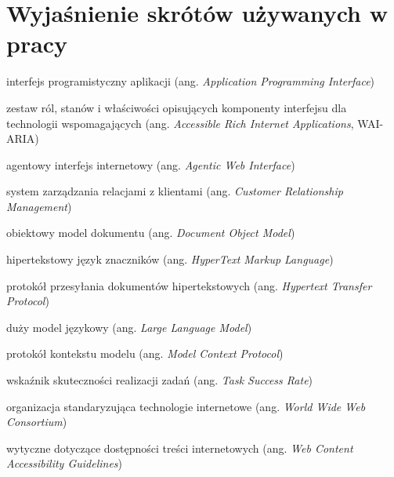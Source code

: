 \documentclass[a4paper,12pt,twoside]{article}
\begin{document}
\section*{Wyjaśnienie skrótów używanych w pracy}
\begin{description}[leftmargin=2.8cm, labelwidth=2.5cm, itemsep=0pt]
    \item[API] interfejs programistyczny aplikacji (ang. \textit{Application Programming Interface})
    \item[ARIA] zestaw ról, stanów i właściwości opisujących komponenty interfejsu dla technologii wspomagających (ang. \textit{Accessible Rich Internet Applications}, WAI-ARIA)
    \item[AWI] agentowy interfejs internetowy (ang. \textit{Agentic Web Interface})
    \item[CRM] system zarządzania relacjami z klientami (ang. \textit{Customer Relationship Management})
    \item[DOM] obiektowy model dokumentu (ang. \textit{Document Object Model})
    \item[HTML] hipertekstowy język znaczników (ang. \textit{HyperText Markup Language})
    \item[HTTP] protokół przesyłania dokumentów hipertekstowych (ang. \textit{Hypertext Transfer Protocol})
    \item[LLM] duży model językowy (ang. \textit{Large Language Model})
    \item[MCP] protokół kontekstu modelu (ang. \textit{Model Context Protocol})
    \item[TSR] wskaźnik skuteczności realizacji zadań (ang. \textit{Task Success Rate})
    \item[W3C] organizacja standaryzująca technologie internetowe (ang. \textit{World Wide Web Consortium})
    \item[WCAG] wytyczne dotyczące dostępności treści internetowych (ang. \textit{Web Content Accessibility Guidelines})
\end{description}

\newpage

\printbibliography


\newpage
\pagestyle{fancy}
\listoffigures
\clearpage
\newpage
\listoftables
\newpage
\listofmyequations
\newpage
\renewcommand{\lstlistlistingname}{Spis kodów}
\lstlistoflistings

\newpage
% 
\end{document}
